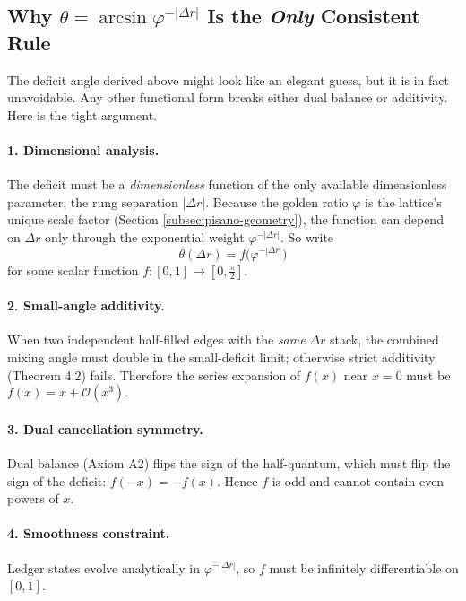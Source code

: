 \documentclass[11pt]{article}
\begin{document}
\subsection{Why \texorpdfstring{$\theta=\arcsin\varphi^{-|{\Delta r}|}$}{θ = arcsin φ-|Δr|} Is the \emph{Only} Consistent Rule}
\label{subsec:unique-rule}

The deficit angle derived above might look like an elegant guess, but it is in fact unavoidable.  Any other functional form breaks either dual balance or additivity.  Here is the tight argument.

\paragraph{1.  Dimensional analysis.}
The deficit must be a \emph{dimensionless} function of the only available dimensionless parameter, the rung separation \(|{\Delta r}|\).  Because the golden ratio \(\varphi\) is the lattice’s unique scale factor (Section \ref{subsec:pisano-geometry}), the function can depend on \(\Delta r\) only through the exponential weight \(\varphi^{-|{\Delta r}|}\).  So write
\[
\theta(\Delta r) = f\!\bigl(\varphi^{-|{\Delta r}|}\bigr)
\]
for some scalar function \(f:[0,1]\to[0,\tfrac{\pi}{2}]\).

\paragraph{2.  Small-angle additivity.}
When two independent half-filled edges with the \emph{same} \(\Delta r\) stack, the combined mixing angle must double in the small-deficit limit; otherwise strict additivity (Theorem 4.2) fails.  Therefore the series expansion of \(f(x)\) near \(x=0\) must be
\(
f(x)=x+\mathcal{O}(x^{3}).
\)

\paragraph{3.  Dual cancellation symmetry.}
Dual balance (Axiom A2) flips the sign of the half-quantum, which must
flip the sign of the deficit:
\(
f(-x)=-f(x).
\)
Hence \(f\) is odd and cannot contain even powers of \(x\).

\paragraph{4.  Smoothness constraint.}
Ledger states evolve analytically in \(\varphi^{-|{\Delta r}|}\), so \(f\) must be infinitely differentiable on \([0,1]\).
\end{document}
